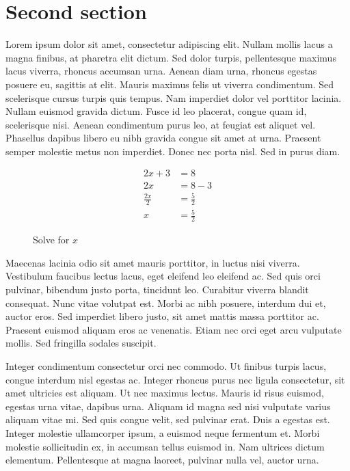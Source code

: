 \section{Second section}

Lorem ipsum dolor sit amet, consectetur adipiscing elit. Nullam mollis lacus a magna finibus, at pharetra elit dictum. Sed dolor turpis, pellentesque maximus lacus viverra, rhoncus accumsan urna. Aenean diam urna, rhoncus egestas posuere eu, sagittis at elit. Mauris maximus felis ut viverra condimentum. Sed scelerisque cursus turpis quis tempus. Nam imperdiet dolor vel porttitor lacinia. Nullam euismod gravida dictum. Fusce id leo placerat, congue quam id, scelerisque nisi. Aenean condimentum purus leo, at feugiat est aliquet vel. Phasellus dapibus libero eu nibh gravida congue sit amet at urna. Praesent semper molestie metus non imperdiet. Donec nec porta nisl. Sed in purus diam.

\begin{figure}[H]
    \begin{align*}
        2x + 3       &= 8 \\
        2x           &= 8 - 3 \\
        \frac{2x}{2} &= \frac{5}{2} \\
        x            &= \frac{5}{2}
    \end{align*}
    \caption{Solve for $x$}
\end{figure}

Maecenas lacinia odio sit amet mauris porttitor, in luctus nisi viverra. Vestibulum faucibus lectus lacus, eget eleifend leo eleifend ac. Sed quis orci pulvinar, bibendum justo porta, tincidunt leo. Curabitur viverra blandit consequat. Nunc vitae volutpat est. Morbi ac nibh posuere, interdum dui et, auctor eros. Sed imperdiet libero justo, sit amet mattis massa porttitor ac. Praesent euismod aliquam eros ac venenatis. Etiam nec orci eget arcu vulputate mollis. Sed fringilla sodales suscipit.

Integer condimentum consectetur orci nec commodo. Ut finibus turpis lacus, congue interdum nisl egestas ac. Integer rhoncus purus nec ligula consectetur, sit amet ultricies est aliquam. Ut nec maximus lectus. Mauris id risus euismod, egestas urna vitae, dapibus urna. Aliquam id magna sed nisi vulputate varius aliquam vitae mi. Sed quis congue velit, sed pulvinar erat. Duis a egestas est. Integer molestie ullamcorper ipsum, a euismod neque fermentum et. Morbi molestie sollicitudin ex, in accumsan tellus euismod in. Nam ultrices dictum elementum. Pellentesque at magna laoreet, pulvinar nulla vel, auctor urna.

